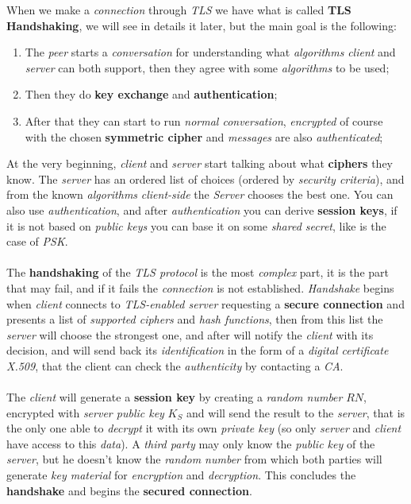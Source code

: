 \documentclass{article}
\begin{document}
When we make a \emph{connection} through \emph{TLS} we have what is called \textbf{TLS Handshaking}, we will see in details it later, but the main goal is the following:
\begin{enumerate}
\item The \emph{peer} starts a \emph{conversation} for understanding what \emph{algorithms} \emph{client} and \emph{server} can both support, then they agree with some \emph{algorithms} to be used; 
\item Then they do \textbf{key exchange} and \textbf{authentication}; 
\item After that they can start to run \emph{normal conversation}, \emph{encrypted} of course with the chosen \textbf{symmetric cipher} and \emph{messages} are also \emph{authenticated};
\end{enumerate}
At the very beginning, \emph{client} and \emph{server} start talking about what \textbf{ciphers} they know. The \emph{server} has an ordered list of choices (ordered by \emph{security criteria}), and from the known \emph{algorithms} \emph{client-side} the \emph{Server} chooses the best one. You can also use \emph{authentication}, and after \emph{authentication} you can derive \textbf{session keys}, if it is not based on \emph{public keys} you can base it on some \emph{shared secret}, like is the case of \emph{PSK}. \\\\
The \textbf{handshaking} of the \emph{TLS protocol} is the most \emph{complex} part, it is the part that may fail, and if it fails the \emph{connection} is not established. \emph{Handshake} begins when \emph{client} connects to \emph{TLS-enabled server} requesting a \textbf{secure connection} and presents a list of \emph{supported ciphers} and \emph{hash functions}, then from this list the \emph{server} will choose the strongest one, and after will notify the \emph{client} with its decision, and will send back its \emph{identification} in the form of a \emph{digital certificate X.509}, that the client can check the \emph{authenticity} by contacting a \emph{CA}. \\\\
The \emph{client} will generate a \textbf{session key} by creating a \emph{random number} $RN$, encrypted with \emph{server public key} $K_S$ and will send the result to the \emph{server}, that is the only one able to \emph{decrypt} it with its own \emph{private key} (so only \emph{server} and \emph{client} have access to this \emph{data}). A \emph{third party} may only know the \emph{public key} of the \emph{server}, but he doesn't know the \emph{random number} from which both parties will generate \emph{key material} for \emph{encryption} and \emph{decryption}. This concludes the \textbf{handshake} and begins the \textbf{secured connection}. \\\\
\end{document}
